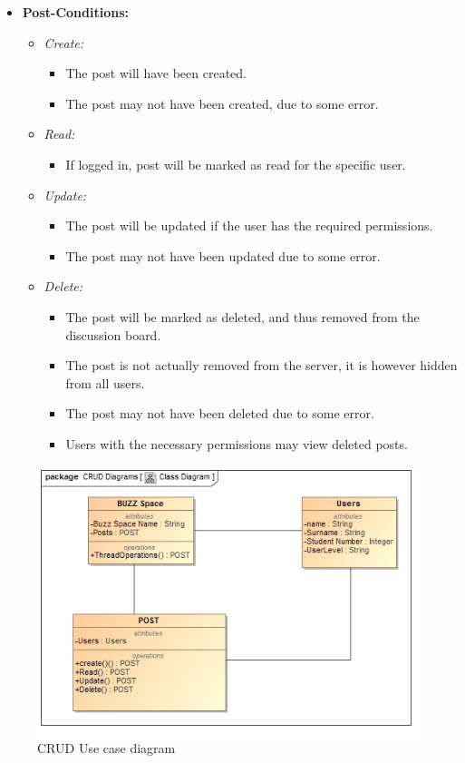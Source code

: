 \documentclass[11pt]{article}
\begin{document}
\begin{enumerate}
\begin{itemize}
\begin{itemize}
		\end{itemize}
		\item \textbf{Post-Conditions: }
		\begin{itemize}
		\item \textit{Create: }
			\begin{itemize}
			\item The post will have been created.
			\item The post may not have been created, due to some error.
			\end{itemize}
		\item \textit{Read: }
			\begin{itemize}
			\item If logged in, post will be marked as read for the 				specific user.
			\end{itemize}
		\item \textit{Update: }
			\begin{itemize}
			\item The post will be updated if the user has the required permissions.
			\item The post may not have been updated due to some error.
			\end{itemize}
		\item \textit{Delete: }
			\begin{itemize}
			\item The post will be marked as deleted, and thus removed 					from the discussion board.
			\item The post is not actually removed from the server, it is however hidden from all users.
		\item The post may not have been deleted due to some error. 
		\item Users with the necessary permissions may view deleted posts.
			\end{itemize}			
			
		\end{itemize}
	
	\end{itemize}
	
\graphicspath{ {../Diagrams/Kyhle/Class_Diagrams/} }	
	\begin{figure}[H]	
    	\includegraphics[scale=0.5]{CRUD.jpg}
    	\caption{CRUD Use case diagram}
	\end{figure}
		

\end{enumerate}
\end{document}
